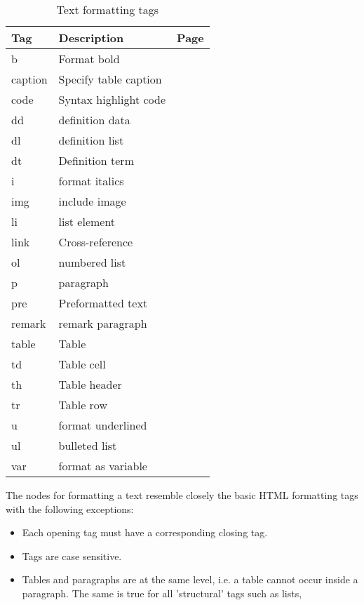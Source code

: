 \begin{table}[ht]
\caption{Text formatting tags}\label{tab:formattags}
\begin{tabularx}{\textwidth}{lXr}
Tag & Description & Page \\ \hline
b & Format bold & \pageref{tag:b} \\
caption & Specify table caption & \pageref{tag:caption} \\
code & Syntax highlight code & \pageref{tag:code} \\
dd & definition data & \pageref{tag:dd} \\
dl & definition list & \pageref{tag:dl} \\
dt & Definition term & \pageref{tag:dt} \\
i & format italics & \pageref{tag:i} \\
img & include image & \pageref{tag:img} \\
li & list element & \pageref{tag:li} \\
link & Cross-reference & \pageref{tag:link} \\
ol & numbered list & \pageref{tag:ol} \\
p & paragraph & \pageref{tag:p} \\
pre & Preformatted text & \pageref{tag:pre} \\
remark & remark paragraph & \pageref{tag:remark} \\
table & Table & \pageref{tag:table} \\
td & Table cell & \pageref{tag:td} \\
th & Table header & \pageref{tag:th} \\
tr & Table row & \pageref{tag:tr} \\
u & format underlined & \pageref{tag:u} \\
ul & bulleted list & \pageref{tag:ul} \\
var & format as variable & \pageref{tag:var} \\ \hline
\end{tabularx}
\end{table}

The nodes for formatting a text resemble closely the basic HTML formatting tags with the 
following exceptions:
\begin{itemize}
\item Each opening tag must have a corresponding closing tag.
\item Tags are case sensitive. 
\item Tables and paragraphs are at the same level, i.e. a table cannot occur
inside a paragraph. The same is true for all 'structural' tags such as
lists, 
\end{itemize}

